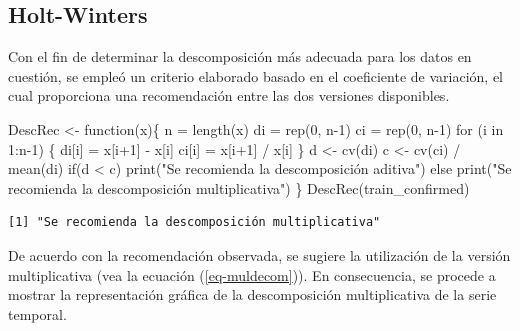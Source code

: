 \documentclass[
  us-letterpaper,
]{scrreprt}
\newenvironment{Shaded}{\begin{snugshade}}{\end{snugshade}}
\newcommand{\ControlFlowTok}[1]{\textcolor[rgb]{0.00,0.23,0.31}{#1}}
\newcommand{\DecValTok}[1]{\textcolor[rgb]{0.68,0.00,0.00}{#1}}
\newcommand{\FunctionTok}[1]{\textcolor[rgb]{0.28,0.35,0.67}{#1}}
\newcommand{\NormalTok}[1]{\textcolor[rgb]{0.00,0.23,0.31}{#1}}
\newcommand{\OtherTok}[1]{\textcolor[rgb]{0.00,0.23,0.31}{#1}}
\newcommand{\SpecialCharTok}[1]{\textcolor[rgb]{0.37,0.37,0.37}{#1}}
\newcommand{\StringTok}[1]{\textcolor[rgb]{0.13,0.47,0.30}{#1}}
\theoremstyle{plain}
\theoremstyle{definition}
\theoremstyle{definition}
\theoremstyle{plain}
\theoremstyle{remark}
\begin{document}
\subsection{Holt-Winters}\label{sec-holt-winters}

Con el fin de determinar la descomposición más adecuada para los datos
en cuestión, se empleó un criterio elaborado basado en el coeficiente de
variación, el cual proporciona una recomendación entre las dos versiones
disponibles.

\begin{Shaded}
\begin{Highlighting}[]
\NormalTok{DescRec }\OtherTok{\textless{}{-}} \ControlFlowTok{function}\NormalTok{(x)\{}
\NormalTok{  n }\OtherTok{=} \FunctionTok{length}\NormalTok{(x)}
\NormalTok{  di }\OtherTok{=} \FunctionTok{rep}\NormalTok{(}\DecValTok{0}\NormalTok{, n}\DecValTok{{-}1}\NormalTok{)}
\NormalTok{  ci }\OtherTok{=} \FunctionTok{rep}\NormalTok{(}\DecValTok{0}\NormalTok{, n}\DecValTok{{-}1}\NormalTok{)}
  \ControlFlowTok{for}\NormalTok{ (i }\ControlFlowTok{in} \DecValTok{1}\SpecialCharTok{:}\NormalTok{n}\DecValTok{{-}1}\NormalTok{) \{}
\NormalTok{    di[i] }\OtherTok{=}\NormalTok{ x[i}\SpecialCharTok{+}\DecValTok{1}\NormalTok{] }\SpecialCharTok{{-}}\NormalTok{ x[i]}
\NormalTok{    ci[i] }\OtherTok{=}\NormalTok{ x[i}\SpecialCharTok{+}\DecValTok{1}\NormalTok{] }\SpecialCharTok{/}\NormalTok{ x[i]}
\NormalTok{  \}}
\NormalTok{  d }\OtherTok{\textless{}{-}} \FunctionTok{cv}\NormalTok{(di) }
\NormalTok{  c }\OtherTok{\textless{}{-}} \FunctionTok{cv}\NormalTok{(ci) }\SpecialCharTok{/} \FunctionTok{mean}\NormalTok{(di)}
  \ControlFlowTok{if}\NormalTok{(d }\SpecialCharTok{\textless{}}\NormalTok{ c)}
    \FunctionTok{print}\NormalTok{(}\StringTok{"Se recomienda la descomposición aditiva"}\NormalTok{)}
  \ControlFlowTok{else}
    \FunctionTok{print}\NormalTok{(}\StringTok{"Se recomienda la descomposición multiplicativa"}\NormalTok{)}
\NormalTok{\}}
\FunctionTok{DescRec}\NormalTok{(train\_confirmed)}
\end{Highlighting}
\end{Shaded}

\begin{verbatim}
[1] "Se recomienda la descomposición multiplicativa"
\end{verbatim}

De acuerdo con la recomendación observada, se sugiere la utilización de
la versión multiplicativa (vea la ecuación (\ref{eq-muldecom})). En
consecuencia, se procede a mostrar la representación gráfica de la
descomposición multiplicativa de la serie temporal.
\end{document}
